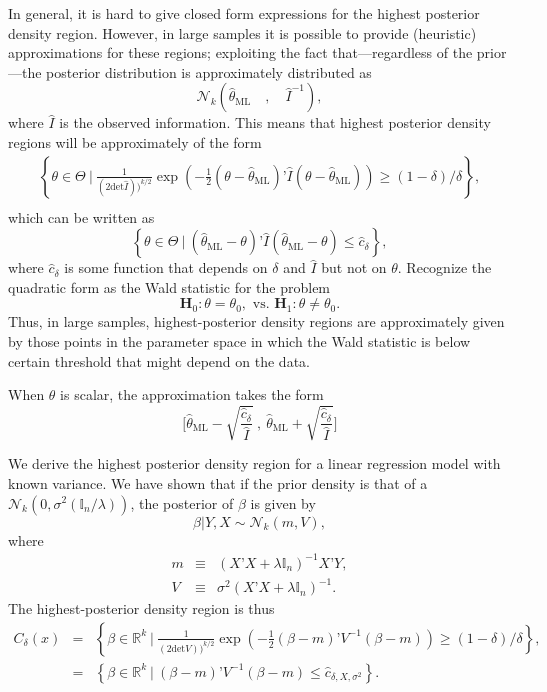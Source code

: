 \documentclass[11pt]{article} %
\begin{document}
In general, it is hard to give closed form expressions for the highest posterior density region. However, in large samples it is possible to provide (heuristic) approximations for these regions; exploiting the fact that---regardless of the prior---the posterior distribution is approximately distributed as
\[  \mathcal{N}_{k} \left(  \widehat{\theta}_{\textrm{ML}} \quad, \quad \widehat{I}^{-1} \right),   \]
\noindent where $\widehat{I}$ is the observed information. This means that highest posterior density regions will be approximately of the form 
\begin{eqnarray*}
\left \{ \theta \in \Theta \: \Bigg | \:  \frac{1}{ (2 \textrm{det} \widehat{I}))^{k/2} } \exp \left( -\frac{1}{2} (\theta - \widehat{\theta}_{\textrm{ML}}) ’\widehat{I}   (\theta - \widehat{\theta}_{\textrm{ML}})\right)  \geq (1-\delta)/\delta \right \}, \\
\end{eqnarray*}
which can be written as 
\[ \left \{ \theta \in \Theta \: \Bigg | \:  (\widehat{\theta}_{\textrm{ML}} - \theta) ’\widehat{I}   (\widehat{\theta}_{\textrm{ML}}-\theta)   \leq \widehat{c}_{\delta} \right \}, 
\]
\noindent where $\widehat{c}_{\delta}$ is some function that depends on $\delta$ and $\widehat{I}$ but not on $\theta$. Recognize the quadratic form as the Wald statistic for the problem
\[ \mathbf{H}_0: \theta = \theta_0, \textrm{ vs. } \mathbf{H}_1: \theta \neq \theta_0. \]
Thus, in large samples, highest-posterior density regions are approximately given by those points in the parameter space in which the Wald statistic is below certain threshold that might depend on the data. 

When $\theta$ is scalar, the approximation takes the form
\[ \Big[ \widehat{\theta}_{\textrm{ML}} - \sqrt{\frac{\widehat{c}_{\delta}}{\widehat{I}}} \:, \: \widehat{\theta}_{\textrm{ML}} + \sqrt{\frac{\widehat{c}_{\delta}}{\widehat{I}}} \Big]  \]


 We derive the highest posterior density region for a linear regression model with known variance. We have shown that if the prior density is that of a $\mathcal{N}_{k}(0, \sigma^2 (\mathbb{I}_n/\lambda))$, the posterior of $\beta$ is given by
\[  \beta | Y, X \sim \mathcal{N}_{k} ( m , V   ),  \]
where 
\begin{eqnarray*}
m  &\equiv& (X’X + \lambda \mathbb{I}_n)^{-1} X’Y, \\
V  & \equiv & \sigma^2  (X’X + \lambda \mathbb{I}_n)^{-1}.
\end{eqnarray*}
\noindent The highest-posterior density region is thus 
\begin{eqnarray*}
C_{\delta}(x) &= & \left \{ \beta \in \mathbb{R}^{k} \: \Big | \:  \frac{1}{ (2 \textrm{det} V))^{k/2} } \exp \left( -\frac{1}{2 } (\beta - m) ’V^{-1}  (\beta - m) \right)  \geq (1-\delta)/\delta \right \}, \\
&=&  \left \{ \beta \in \mathbb{R}^{k} \: \Big | \:   (\beta - m) ’V^{-1}  (\beta - m)  \leq \widehat{c}_{\delta,X,\sigma^2} \right \}.
\end{eqnarray*}
\end{document}
